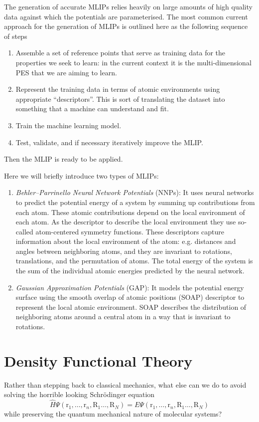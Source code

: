 \documentclass{article}
\theoremstyle{plain}\theoremheaderfont{\normalfont\itshape}\theorembodyfont{\rmfamily}\theoremseparator{.}\newtheorem*{rem}{Remark}\newtheorem*{ex}{Example}\newtheorem*{proof}{Proof}\newtheorem*{altp}{Alternative proof}
\theoremstyle{plain}\theoremheaderfont{\normalfont\bfseries}\theorembodyfont{\rmfamily}\theoremseparator{.}\newtheorem{thm}{Theorem}[section]\newtheorem{lem}[thm]{Lemma}\newtheorem{prop}[thm]{Proposition}\newtheorem*{cor}{Corollary}\newtheorem{defn}[thm]{Definition}\newtheorem{clm}[thm]{Claim}\newtheorem{clminproof}{Claim}\newtheorem{pos}{Postulate}[section]
\theoremstyle{break}\theoremheaderfont{\normalfont\itshape}\theorembodyfont{\rmfamily}\theoremseparator{.\medskip}\newtheorem*{proofskip}{Proof}\newtheorem*{exs}{Examples}\newtheorem*{rems}{Remarks}
\theoremstyle{break}\theoremheaderfont{\normalfont\bfseries}\theorembodyfont{\rmfamily}\theoremseparator{.\medskip}\newtheorem{lemskip}[thm]{Lemma}\newtheorem{defnskip}[thm]{Definition}\newtheorem{propskip}[thm]{Proposition}\newtheorem{thmskip}[thm]{Theorem}
\numberwithin{equation}{section}
\newcommand{\vb}[1]{\bm{\mathrm{#1}}}
\begin{document}
    The generation of accurate MLIPs relies heavily on large amounts of high quality data against which the potentials are parameterised. The most common current approach for the generation of MLIPs is outlined here as the following sequence of steps
    \begin{enumerate}[topsep=0pt,label=(\roman*)]
        \item Assemble a set of reference points that serve as training data for the properties we seek to learn: in the current context it is the multi-dimensional PES that we are aiming to learn.
        \item Represent the training data in terms of atomic environments using appropriate ``descriptors''. This is sort of translating the dataset into something that a machine can understand and fit.
        \item Train the machine learning model.
        \item Test, validate, and if necessary iteratively improve the MLIP.
    \end{enumerate}
    Then the MLIP is ready to be applied.

    Here we will briefly introduce two types of MLIPs:
    \begin{enumerate}[topsep=0pt,label=(\roman*)]
        \item \textit{Behler--Parrinello Neural Network Potentials} (NNPs): It uses neural networks to predict the potential energy of a system by summing up contributions from each atom. These atomic contributions depend on the local environment of each atom. As the descriptor to describe the local environment they use so-called atom-centered symmetry functions. These descriptors capture information about the local environment of the atom: e.g. distances and angles between neighboring atoms, and they are invariant to rotations, translations, and the permutation of atoms. The total energy of the system is the sum of the individual atomic energies predicted by the neural network.
        \item \textit{Gaussian Approximation Potentials} (GAP): It models the potential energy surface using the smooth overlap of atomic positions (SOAP) descriptor to represent the local atomic environment. SOAP describes the distribution of neighboring atoms around a central atom in a way that is invariant to rotations.
    \end{enumerate}

    \section{Density Functional Theory}
    Rather than stepping back to classical mechanics, what else can we do to avoid solving the horrible looking Schr\"{o}dinger equation
    \begin{equation}
        \hat{H}\Psi(\vb{r}_1,\dots,\vb{r}_n,\vb{R}_1\dots,\vb{R}_N)=E\Psi(\vb{r}_1,\dots,\vb{r}_n,\vb{R}_1\dots,\vb{R}_N)
    \end{equation}
    while preserving the quantum mechanical nature of molecular systems?
\end{document}
